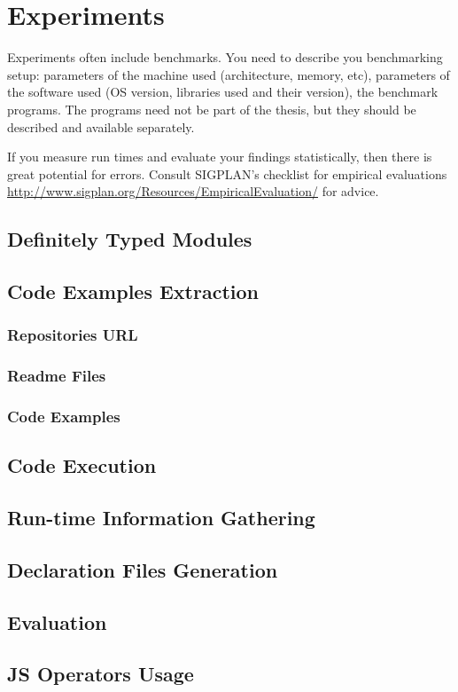 \chapter{Experiments}\label{chap:experiments}

Experiments often include benchmarks.
You need to describe you benchmarking setup: parameters of the machine used (architecture, memory, etc), parameters of the software used (OS version, libraries used and their version), the benchmark programs.
The programs need not be part of the thesis, but they should be described and available separately.

If you measure run times and evaluate your findings statistically, then there is great potential for errors.
Consult SIGPLAN's checklist for empirical evaluations \url{http://www.sigplan.org/Resources/EmpiricalEvaluation/} for advice. 




\section{Definitely Typed Modules}

\section{Code Examples Extraction}
\subsection{Repositories URL}
\subsection{Readme Files}
\subsection{Code Examples}

\section{Code Execution}

\section{Run-time Information Gathering}

\section{Declaration Files Generation}

\section{Evaluation}

\section{JS Operators Usage}
